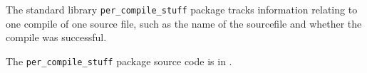 
The standard library {\tt per\_compile\_stuff} package tracks information relating to 
one compile of one source file, such as 
the name of the sourcefile and whether 
the compile was successful.

The {\tt per\_compile\_stuff} package source code is in .





